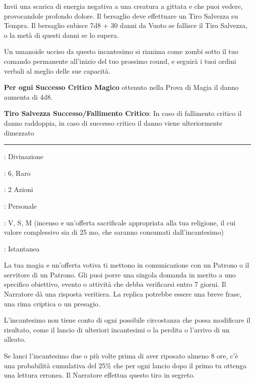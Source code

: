 \begin{multicols}{2}
Invii una scarica di energia negativa a una creatura a gittata e che puoi vedere, provocandole profondo dolore. Il bersaglio deve effettuare un Tiro Salvezza su Tempra. Il bersaglio subisce 7d8 + 30 danni da Vuoto se fallisce il Tiro Salvezza, o la metà di questi danni se lo supera.

Un umanoide ucciso da questo incantesimo si rianima come zombi sotto il tuo comando permanente all'inizio del tuo prossimo round, e seguirà i tuoi ordini verbali al meglio delle sue capacità.

\textbf{Per ogni Successo Critico Magico} ottenuto nella Prova di Magia il danno aumenta di 4d8.

\textbf{Tiro Salvezza Successo/Fallimento Critico}: In caso di fallimento critico il danno raddoppia, in caso di successo critico il danno viene ulteriormente dimezzato

\smallskip\noindent\rule{\linewidth}{2pt} \hypertarget{Divinazione}{}\medskip{}
\noindent
\begin{description}[noitemsep, topsep=0pt, parsep=0pt, partopsep=0pt, leftmargin=0cm, labelwidth=2.8cm]
	\item[\textbf{Lista di Magia}]: Divinazione
	\item[\textbf{Livello}]: 6, Raro
	\item[\textbf{T. di Lancio}]: 2 Azioni
	\item[\textbf{Gittata}]: Personale
	\item[\textbf{Componenti}]: V, S, M (incenso e un'offerta sacrificale appropriata alla tua religione, il cui valore complessivo sia di 25 mo, che saranno consumati dall'incantesimo)
	\item[\textbf{Durata}]: Istantanea
\end{description}

La tua magia e un'offerta votiva ti mettono in comunicazione con un Patrono o il servitore di un Patrono. Gli puoi porre una singola domanda in merito a uno specifico obiettivo, evento o attività che debba verificarsi entro 7 giorni. Il Narratore dà una risposta veritiera. La replica potrebbe essere una breve frase, una rima criptica o un presagio.

L'incantesimo non tiene conto di ogni possibile circostanza che possa modificare il risultato, come il lancio di ulteriori incantesimi o la perdita o l'arrivo di un alleato.

Se lanci l'incantesimo due o più volte prima di aver riposato almeno 8 ore, c'è una probabilità cumulativa del 25\% che per ogni lancio dopo il primo tu ottenga una lettura erronea. Il Narratore effettua questo tiro in segreto.



\end{multicols}
